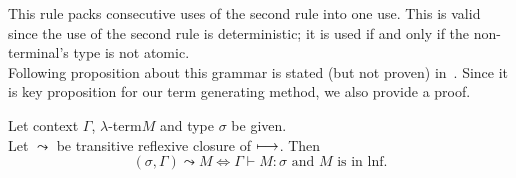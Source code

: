 \documentclass[12pt,a4paper]{report}
\newcommand{\lterm}{$\lambda$-term\xspace}
\newcommand{\tur}[3]{#1\vdash{}#2:#3}
\begin{document}
This rule packs consecutive uses of the second rule into one use.
This is valid since the use of the second rule is deterministic;
it is used if and only if the non-terminal's type is not atomic.\\

Following proposition about this grammar is stated (but not proven)
in~\cite{barendregt10}. Since it is key proposition for our 
term generating method, we also provide a proof.


\newcommand{\garr}{\leadsto}%
\newcommand{\Gp}{\Gamma^\prime}

\begin{proposition}
\label{gram-lnf-prop}
Let context $\Gamma$, \lterm $M$ and type $\sigma$ be given.\\
Let $\garr$ be transitive reflexive closure of $\longmapsto$. 
Then
$$ 
(\sigma,\Gamma) \garr M 
\Leftrightarrow
\tur{\Gamma}{M}{\sigma} \text{ and $M$ is in lnf}.   
$$
\end{proposition}
\end{document}
